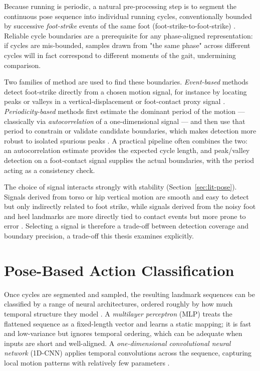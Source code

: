 Because running is periodic, a natural pre-processing step is to segment the
continuous pose sequence into individual running cycles, conventionally bounded
by successive \emph{foot-strike} events of the same foot
(foot-strike-to-foot-strike) \cite{inostroza2025runningcycle, ghoussayni2004gait}.
Reliable cycle boundaries are a prerequisite for any phase-aligned
representation: if cycles are mis-bounded, samples drawn from "the same phase"
across different cycles will in fact correspond to different moments of the gait,
undermining comparison.

Two families of method are used to find these boundaries. \emph{Event-based}
methods detect foot-strike directly from a chosen motion signal, for instance by
locating peaks or valleys in a vertical-displacement or foot-contact proxy
signal \cite{ghoussayni2004gait, zhang2025heelstrike}. \emph{Periodicity-based}
methods first estimate the dominant period of the motion --- classically via
\emph{autocorrelation} of a one-dimensional signal --- and then use that period
to constrain or validate candidate boundaries, which makes detection more robust
to isolated spurious peaks \cite{cutting1978gaitperiodicity}. A practical
pipeline often combines the two: an autocorrelation estimate provides the
expected cycle length, and peak/valley detection on a foot-contact signal
supplies the actual boundaries, with the period acting as a consistency check.

The choice of signal interacts strongly with stability
(Section~\ref{sec:lit-pose}). Signals derived from torso or hip vertical motion
are smooth and easy to detect but only indirectly related to foot strike, while
signals derived from the noisy foot and heel landmarks are more directly tied to
contact events but more prone to error \cite{zhang2025heelstrike}. Selecting a
signal is therefore a trade-off between detection coverage and boundary
precision, a trade-off this thesis examines explicitly.

\section{Pose-Based Action Classification}
\label{sec:lit-pose-class}

Once cycles are segmented and sampled, the resulting landmark sequences can be
classified by a range of neural architectures, ordered roughly by how much
temporal structure they model \cite{yan2018stgcn, jangua2021gait2dposes}. A
\emph{multilayer perceptron} (MLP) treats the flattened sequence as a
fixed-length vector and learns a static mapping; it is fast and low-variance but
ignores temporal ordering, which can be adequate when inputs are short and
well-aligned. A \emph{one-dimensional convolutional neural network} (1D-CNN)
applies temporal convolutions across the sequence, capturing local motion
patterns with relatively few parameters \cite{ordonez2016deephar}.

